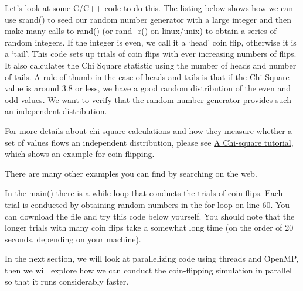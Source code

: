 \documentclass[letterpaper,10pt,openany,oneside]{sphinxmanual}
\begin{document}
Let's look at some C/C++ code to do this.  The listing below
shows how we can use srand() to seed our random number generator with
a large integer and then make many calls to rand() (or rand\_r() on linux/unix)
to obtain a series
of random integers.  If the integer is even, we call it a `head' coin flip, otherwise
it is a `tail'.  This code sets up trials of coin flips with ever increasing
numbers of flips.  It also calculates the Chi Square statistic using the number of heads
and number of tails.  A rule of thumb in the case of heads and tails is that if the
Chi-Square value is around 3.8 or less, we have a good random distribution of the
even and odd values.  We want to verify that the random number generator provides
such an independent distribution.




For more details about chi square calculations and how they measure whether a set of values
flows an independent distribution, please see
\href{http://www.radford.edu/~rsheehy/Gen\_flash/Tutorials/Chi-Square\_tutorial/x2-tut.htm}{A Chi-square tutorial},
which shows an example for coin-flipping.

There are many other examples you can find by searching on the web.



In the main() there is a while loop that conducts the trials of coin flips.  Each trial is
conducted by obtaining random numbers in the for loop on line 60.
You can download the file
 and try this code below yourself.  You should note that the longer trials with many coin flips take a somewhat long time (on the order of 20 seconds, depending on your machine).

In the next section, we will look at parallelizing code using threads and OpenMP, then we will explore how we can conduct the coin-flipping simulation in parallel so that it runs considerably faster.
\end{document}
